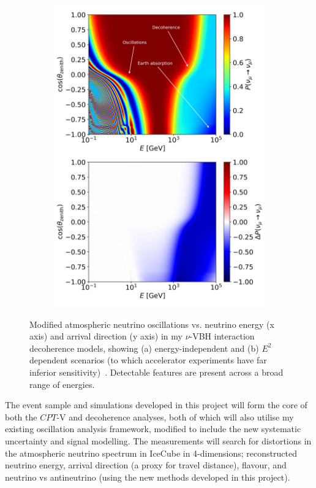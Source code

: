 \documentclass[a4paper,11pt]{article}
\begin{document}
\begin{figure}
\begin{subfigure}[b]{0.5\textwidth}
    \includegraphics[trim=0.0cm 12.7cm 0.cm 0.2cm, clip=true, width=1.\linewidth]{images/atmo_oscillogram_randomize_flavor_n2_matter.png}
    \caption{}
    \end{subfigure}
    \caption{Modified atmospheric neutrino oscillations vs. neutrino energy (x axis) and arrival direction (y axis) in my $\nu$-VBH interaction decoherence models, showing (a) energy-independent and (b) $E^2$ dependent scenarios (to which accelerator experiments have far inferior sensitivity)~\cite{PhysRevD.102.115003}. Detectable features are present across a broad range of energies.}
    \label{fig:decoh_oscillograms}
\end{figure}

The event sample and simulations developed in this project will form the core of both the $CPT$-V and decoherence analyses, both of which will also utilise my existing oscillation analysis framework, modified to include the new systematic uncertainty and signal modelling. The measurements will search for distortions in the atmospheric neutrino spectrum in IceCube in 4-dimensions; reconstructed neutrino energy, arrival direction (a proxy for travel distance), flavour, and neutrino vs antineutrino (using the new methods developed in this project).
\end{document}

